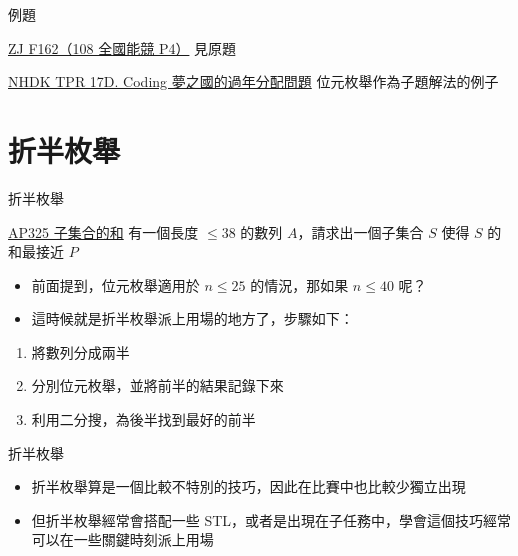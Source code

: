 \documentclass[aspectratio=169]{beamer}
\begin{document}
    \begin{frame}{例題}
        \begin{block}{\href{https://zerojudge.tw/ShowProblem?problemid=f162}{ZJ F162（108 全國能競 P4）}}
            見原題
        \end{block}
        
        \begin{block}{\href{https://codeforces.com/group/H0qY3QmnOW/contest/376232/problem/D}{NHDK TPR 17D. Coding 夢之國的過年分配問題}}
            位元枚舉作為子題解法的例子
        \end{block}
    \end{frame}

    \section{折半枚舉}

    \begin{frame}{折半枚舉}
        \begin{block}{\href{https://judge.tcirc.tw/ShowProblem?problemid=d019}{AP325 子集合的和}}
            有一個長度 $\le 38$ 的數列 $A$，請求出一個子集合 $S$ 使得 $S$ 的和最接近 $P$
        \end{block}

        \begin{itemize}
            \item<1-> 前面提到，位元枚舉適用於 $n \le 25$ 的情況，那如果 $n \le 40$ 呢？
            \item<2-> 這時候就是折半枚舉派上用場的地方了，步驟如下：
        \end{itemize}

        \begin{enumerate}
            \item 將數列分成兩半
            \item 分別位元枚舉，並將前半的結果記錄下來
            \item 利用二分搜，為後半找到最好的前半
        \end{enumerate}
    \end{frame}

    \begin{frame}{折半枚舉}
        \begin{itemize}
            \item 折半枚舉算是一個比較不特別的技巧，因此在比賽中也比較少獨立出現
            \item 但折半枚舉經常會搭配一些 STL，或者是出現在子任務中，學會這個技巧經常可以在一些關鍵時刻派上用場
        \end{itemize}
    \end{frame}
\end{document}
